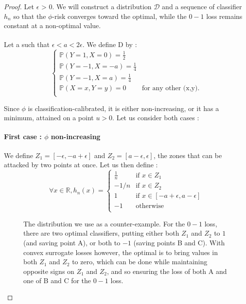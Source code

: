\begin{proof}

Let $\epsilon$ > 0. We will construct a distribution $\mathcal{D}$ and a sequence of classifier $h_n$ so that the $\phi$-risk converges toward the optimal, while the $0-1$ loss remains constant at a non-optimal value.

\paragraph{}Let a such that $\epsilon < a < 2 \epsilon$. We define D by :
\[
\left\{ \begin{array}{ll}
\mathbb{P}(Y=1, X=0) = \frac{1}{2} & \\
\mathbb{P}(Y=-1, X=-a) = \frac{1}{4} & \\
\mathbb{P}(Y=-1, X=a) = \frac{1}{4} & \\
\mathbb{P}(X=x, Y=y) = 0 & \mbox{for any other (x,y).} \\
\end{array} \right.
\]

Since $\phi$ is classification-calibrated, it is either non-increasing, or it has a minimum, attained on a point $u>0$. Let us consider both cases :

\paragraph{First case : $\phi$ non-increasing}

We define $Z_1 = [-\epsilon, -a + \epsilon]$ and $Z_2 = [a-\epsilon, \epsilon]$, the zones that can be attacked by two points at once.
Let us then define : 
\[
\forall x \in \mathbb{R}, h_n(x) = \left\{ \begin{array}{ll}
\frac{1}{n} & \mbox{if } x \in Z_1 \\
-1/n & \mbox{if } x \in Z_2 \\
1 & \mbox{if }x \in [-a+\epsilon, a-\epsilon] \\
-1 & \mbox{otherwise} \\
\end{array} \right.
\]

\begin{figure}
    \centering
    \caption{The distribution we use as a counter-example. For the $0-1$ loss, there are two optimal classifiers, putting either both $Z_1$ and $Z_2$ to $1$ (and saving point A), or both to $-1$ (saving points B and C). With convex surrogate losses however, the optimal is to bring values in both $Z_1$ and $Z_2$ to zero, which can be done while maintaining opposite signs on $Z_1$ and $Z_2$, and so ensuring the loss of both A and one of B and C for the $0-1$ loss. }
    \label{fig:my_label}
\end{figure}



\end{proof}
